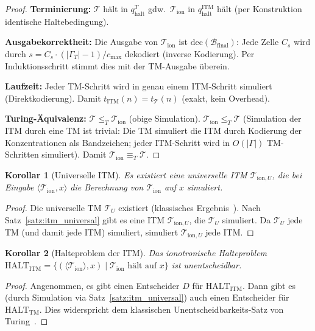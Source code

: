 ﻿\documentclass[a4paper,12pt]{article}
\theoremstyle{plain}
\newtheorem{korollar}{Korollar}
\theoremstyle{definition}
\theoremstyle{remark}
\newcommand{\ITM}{\mathcal{T}_{\mathrm{ion}}}
\begin{document}
\begin{proof}
\textbf{Terminierung:}
$\mathcal{T}$ h\"alt in $q_{\mathrm{halt}}^T$ gdw.\ $\ITM$ in $q_{\mathrm{halt}}^{\mathrm{ITM}}$
h\"alt (per Konstruktion identische Haltebedingung).

\textbf{Ausgabekorrektheit:}
Die Ausgabe von $\ITM$ ist $\mathrm{dec}(\mathcal{B}_{\mathrm{final}})$:
Jede Zelle $C_s$ wird durch $s = C_s \cdot (|\Gamma_T|-1)/c_{\max}$ dekodiert
(inverse Kodierung). Per Induktionsschritt stimmt dies mit der TM-Ausgabe
\"uberein.

\textbf{Laufzeit:}
Jeder TM-Schritt wird in genau einem ITM-Schritt simuliert (Direktkodierung).
Damit $t_{\mathrm{ITM}}(n) = t_{\mathcal{T}}(n)$ (exakt, kein Overhead).

\textbf{Turing-\"Aquivalenz:}
$\mathcal{T} \leq_T \ITM$ (obige Simulation).
$\ITM \leq_T \mathcal{T}$ (Simulation der ITM durch eine TM ist trivial:
Die TM simuliert die ITM durch Kodierung der Konzentrationen als Bandzeichen;
jeder ITM-Schritt wird in $O(|\Gamma|)$ TM-Schritten simuliert).
Damit $\ITM \equiv_T \mathcal{T}$.
\end{proof}

\begin{korollar}[Universelle ITM]
\label{kor:uitm}
Es existiert eine \emph{universelle ITM} $\mathcal{T}_{\mathrm{ion},U}$, die bei Eingabe
$\langle \ITM, x \rangle$ die Berechnung von $\ITM$ auf $x$ simuliert.
\end{korollar}

\begin{proof}
Die universelle TM $\mathcal{T}_U$ existiert (klassisches Ergebnis~\cite{turing1936}).
Nach Satz~\ref{satz:itm_universal} gibt es eine ITM $\mathcal{T}_{\mathrm{ion},U}$, die $\mathcal{T}_U$
simuliert. Da $\mathcal{T}_U$ jede TM (und damit jede ITM) simuliert,
simuliert $\mathcal{T}_{\mathrm{ion},U}$ jede ITM.
\end{proof}

\begin{korollar}[Halteproblem der ITM]
\label{kor:halt}
Das \emph{ionotronische Halteproblem}
$\mathrm{HALT}_{\mathrm{ITM}} = \{(\langle \ITM \rangle, x) \mid \ITM \text{ h\"alt auf } x\}$
ist unentscheidbar.
\end{korollar}

\begin{proof}
Angenommen, es gibt einen Entscheider $D$ f\"ur $\mathrm{HALT}_{\mathrm{ITM}}$.
Dann gibt es (durch Simulation via Satz~\ref{satz:itm_universal}) auch
einen Entscheider f\"ur $\mathrm{HALT}_{\mathrm{TM}}$.
Dies widerspricht dem klassischen Unentscheidbarkeits-Satz von Turing~\cite{turing1936}.
\end{proof}
\end{document}
